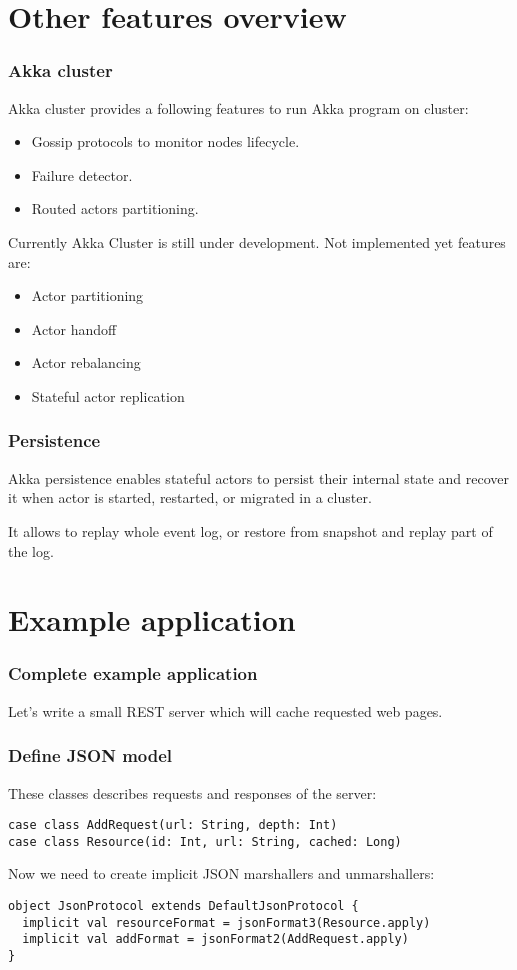 \section{Other features overview}

\begin{frame}
\frametitle{Akka cluster}
Akka cluster provides a following features to run Akka program on cluster:

\begin{itemize}
\item Gossip protocols to monitor nodes lifecycle.
\item Failure detector.
\item Routed actors partitioning.
\end{itemize}

Currently Akka Cluster is still under development.  Not implemented yet features are:

\begin{itemize}
\item Actor partitioning
\item Actor handoff
\item Actor rebalancing
\item Stateful actor replication
\end{itemize}
\end{frame}

\begin{frame}
\frametitle{Persistence}
Akka persistence enables stateful actors to persist their internal state and recover it
when actor is started, restarted, or migrated in a cluster.

It allows to replay whole event log, or restore from snapshot and replay part of the log.
\end{frame}

\section{Example application}

\begin{frame}
\frametitle{Complete example application}
Let's write a small REST server which will cache requested web pages.

\end{frame}

\begin{frame}[fragile]
\frametitle{Define JSON model}
These classes describes requests and responses of the server:

\begin{lstlisting}
case class AddRequest(url: String, depth: Int)
case class Resource(id: Int, url: String, cached: Long)
\end{lstlisting}

Now we need to create implicit JSON marshallers and unmarshallers:

\begin{lstlisting}
object JsonProtocol extends DefaultJsonProtocol {
  implicit val resourceFormat = jsonFormat3(Resource.apply)
  implicit val addFormat = jsonFormat2(AddRequest.apply)
}
\end{lstlisting}
\end{frame}

